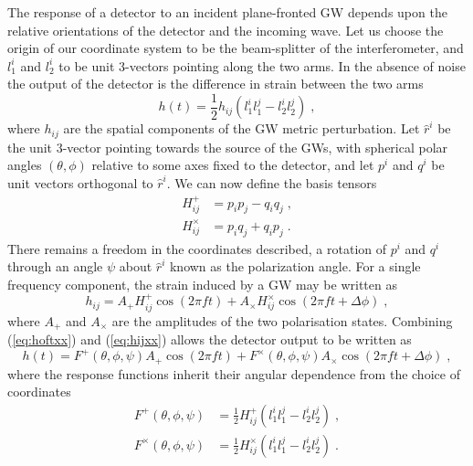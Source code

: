 The response of a detector to an incident plane-fronted GW depends upon the relative orientations of the detector and the incoming wave. Let us choose the origin of our coordinate system to be the beam-splitter of the interferometer, and $l_{1}^{i}$ and $l_{2}^{i}$ to be unit 3-vectors pointing along the two arms. In the absence of noise the output of the detector is the difference in strain between the two arms \citep{Thorne1987}
\begin{equation}\label{eq:hoftxx}
h(t)=\frac{1}{2}h_{ij}\left( l_{1}^{i}l_{1}^{j}-l_{2}^{i}l_{2}^{j} \right)\; ,
\end{equation}
where $h_{ij}$ are the spatial components of the GW metric perturbation. Let $\hat{r}^{i}$ be the unit 3-vector pointing towards the source of the GWs, with spherical polar angles $(\theta,\phi)$ relative to some axes fixed to the detector, and let $p^{i}$ and $q^{i}$ be unit vectors orthogonal to $\hat{r}^{i}$. We can now define the basis tensors
\begin{eqnarray}
H^{+}_{ij}&=p_{i}p_{j}-q_{i}q_{j} \; , \\
H^{\times}_{ij}&=p_{i}q_{j}+q_{i}p_{j} \; .
\end{eqnarray}
There remains a freedom in the coordinates described, a rotation of $p^{i}$ and $q^{i}$ through an angle $\psi$ about $\hat{r}^{i}$ known as the polarization angle. For a single frequency component, the strain induced by a GW may be written as
\begin{equation}\label{eq:hijxx}
h_{ij}=A_{+}H^{+}_{ij}\cos\left(2\pi ft\right)+A_{\times}H^{\times}_{ij}\cos\left(2\pi ft+\Delta \phi\right) \; ,
\end{equation}
where $A_{+}$ and $A_{\times}$ are the amplitudes of the two polarisation states. Combining (\ref{eq:hoftxx}) and (\ref{eq:hijxx}) allows the detector output to be written as
\begin{equation}
h(t)=F^{+}(\theta,\phi,\psi)A_{+}\cos\left(2\pi ft\right)+F^{\times}(\theta,\phi,\psi)A_{\times}\cos\left(2\pi f t + \Delta\phi \right)\; ,
\end{equation}
where the response functions inherit their angular dependence from the choice of coordinates
\begin{eqnarray}\label{eq:responsefuncs}
F^{+}(\theta,\phi,\psi)&=\frac{1}{2}H^{+}_{ij}\left(l_{1}^{i}l_{1}^{j}-l_{2}^{i}l_{2}^{j}\right) \; , \\
F^{\times}(\theta,\phi,\psi)&=\frac{1}{2}H^{\times}_{ij}\left(l_{1}^{i}l_{1}^{j}-l_{2}^{i}l_{2}^{j}\right) \; . 
\end{eqnarray}


